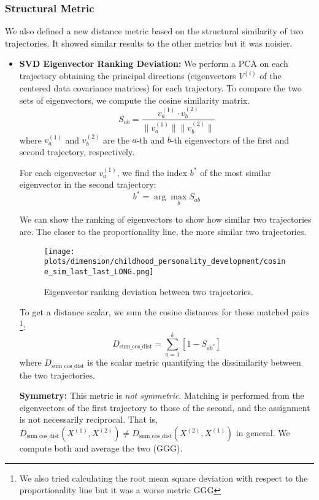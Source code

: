 \documentclass[a4paper,12pt]{article}
\begin{document}
\subsubsection{Structural Metric}
\label{subsubsec:structural_metric}
\label{subsubsec:structural_metric} %
We also defined a new distance metric based on the structural similarity of two trajectories. It showed similar results to the other metrics but it was noisier.
\begin{itemize}
        
    \item \textbf{SVD Eigenvector Ranking Deviation:} We perform a PCA on each trajectory obtaining the principal directions (eigenvectors $V^{(i)}$ of the centered data covariance matrices) for each trajectory. To compare the two sets of eigenvectors, we compute the cosine similarity matrix.
    \[
    S_{ab} = \frac{v^{(1)}_a \cdot v^{(2)}_b}{\|v^{(1)}_a\| \|v^{(2)}_b\|}
    \]
    where $v^{(1)}_a$ and $v^{(2)}_b$ are the $a$-th and $b$-th eigenvectors of the first and second trajectory, respectively.

    For each eigenvector $v^{(1)}_a$, we find the index $b^*$ of the most similar eigenvector in the second trajectory:
    \[
    b^* = \arg\max_b S_{ab}
    \]

    We can show the ranking of eigenvectors to show how similar two trajectories are. The closer to the proportionality line, the more similar two trajectories.
    \begin{figure}[H]
    \centering
    \texttt{[image: plots/dimension/childhood\_personality\_development/cosine\_sim\_last\_last\_LONG.png]}
    \caption{Eigenvector ranking deviation between two trajectories.}
    \label{fig:eigenvector_ranking}
\end{figure}

    To get a distance scalar, we sum the cosine distances for these matched pairs \footnote{We also tried calculating the root mean square deviation with respect to the proportionality line but it was a worse metric GGG}:
    \[
    D_{\text{sum\_cos\_dist}} = \sum_{a=1}^k \left[1 - S_{a b^*}\right]
    \]
    where $D_{\text{sum\_cos\_dist}}$ is the scalar metric quantifying the dissimilarity between the two trajectories.

    \textbf{Symmetry:} This metric is \emph{not symmetric}. Matching is performed from the eigenvectors of the first trajectory to those of the second, and the assignment is not necessarily reciprocal. That is, $D_{\text{sum\_cos\_dist}}(X^{(1)}, X^{(2)}) \neq D_{\text{sum\_cos\_dist}}(X^{(2)}, X^{(1)})$ in general. We compute both and average the two (GGG).

\end{itemize}
\end{document}
